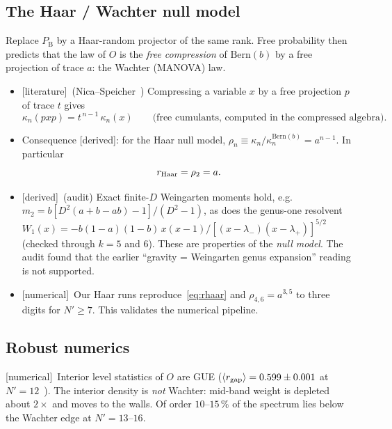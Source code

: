 \documentclass[11pt]{article}
\newcommand{\PB}{P_{\mathrm B}}
\newcommand{\Np}{N'}
\newcommand{\Bern}{\mathrm{Bern}}
\newcommand{\tagbox}[2]{\textsf{\small\color{#1}[#2]}}
\newcommand{\EST}{\tagbox{cest}{literature}}
\newcommand{\DER}{\tagbox{cder}{derived}}
\newcommand{\NUM}{\tagbox{cnum}{numerical}}
\theoremstyle{remark}
\begin{document}
\subsection{The Haar / Wachter null model}\label{sec:haar}
Replace $\PB$ by a Haar-random projector of the same rank. Free probability then predicts that the law of $O$ is
the \emph{free compression} of $\Bern(b)$ by a free projection of trace $a$: the Wachter (MANOVA) law.
\begin{itemize}\itemsep1pt
\item \EST\ (Nica--Speicher~\cite{NS}) Compressing a variable $x$ by a free projection $p$ of trace $t$ gives
  \begin{equation}
  \kappa_n(pxp)=t^{\,n-1}\,\kappa_n(x)\qquad\text{(free cumulants, computed in the compressed algebra)}.
  \label{eq:NS}
  \end{equation}
\item Consequence \DER: for the Haar null model, $\rho_n\equiv\kappa_n/\kappa_n^{\Bern(b)}=a^{n-1}$. In particular
  \begin{equation}
  r_{\rm Haar}=\rho_2=a .
  \label{eq:rhaar}
  \end{equation}
\item \DER\ (audit) Exact finite-$D$ Weingarten moments hold, e.g.\ $m_2=b[D^2(a+b-ab)-1]/(D^2-1)$, as does the
  genus-one resolvent $W_1(x)=-b(1-a)(1-b)\,x(x-1)/[(x-\lambda_-)(x-\lambda_+)]^{5/2}$ (checked through $k=5$ and $6$).
  These are properties of the \emph{null model}. The audit found that the earlier ``gravity = Weingarten genus
  expansion'' reading is not supported.
\item \NUM\ Our Haar runs reproduce~\eqref{eq:rhaar} and $\rho_{4,6}=a^{3,5}$ to three digits for $\Np\ge7$. This
  validates the numerical pipeline.
\end{itemize}

\subsection{Robust numerics}
\NUM\ Interior level statistics of $O$ are GUE ($\langle r_{\rm gap}\rangle=0.599\pm0.001$ at $\Np=12$~\cite{CV}).
The interior density is \emph{not} Wachter: mid-band weight is depleted about $2\times$ and moves to the walls. Of order
$10$--$15\,\%$ of the spectrum lies below the Wachter edge at $\Np=13$--$16$.
\end{document}
